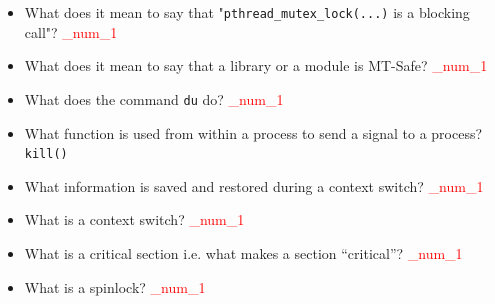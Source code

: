 \documentclass[9pt,landscape]{memoir}
\newcommand{\answer}[1]{\textcolor{red}{_num_1}}
\begin{document}
\begin{multicols}{6}
\begin{itemize}
    \item What does it mean to say that "\verb$pthread_mutex_lock(...)$ is a blocking call"?  \answer{If the mutex lock requested by this call is held by another process, the called will be blocked until the lock is released by the current owner (via executing a \texttt{pthread\_mutex\_unlock()} call)}
    \item What does it mean to say that a library or a module is MT-Safe? \answer{MT-Safe: MultiThread-Safe which means that the behavior of the function is stable when two threads try to use it at the same time. In other words, a library/module protects its global and static data with locks and can provide a reasonable amount of concurrency.}
    \item  What does the command \verb$du$ do? \answer{figures out disk usage (size of a directory)}
    \item What function is used from within a process to send a signal to a process? \verb$kill()$
    \item What information is saved and restored during a context switch? \answer{Context switch requires saving the state of the old process and loading the saved state for the new process. Process state minimally includes current contents of registers, program counter, stack pointer, file descriptors, etc.}
    \item What is a context switch? \answer{Switching the CPU to another process.}
    \item What is a critical section i.e. what makes a section ``critical''? \answer{In an asynchronous procedure of a computer program, a part that can not be executed simultaneously with an associated critical section of another asynchronous procedure. In general, a code segment in which shared variables, shared file descriptors (shared resources) are accessed is considered a critical section.}
    \item What is a spinlock? \answer{When a process is in its critical section, any other process that tries to enter the same CS must loop continuously in the entry code of the CS until the first one gets out. The spinlock is the most common technique used for protecting a CS in Linux. It is easy to implement but has the disadvantage that locked-out threads continue to execute in a busy-waiting mode. Thus spinlocks are most effective in situations where the wait-time is expected to be very short.}
\end{itemize}


\end{multicols}
\end{document}
